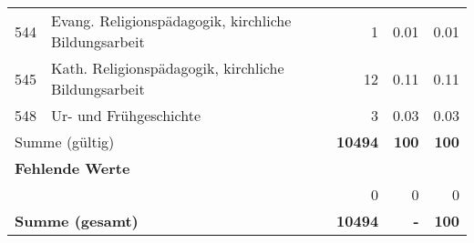 \begin{longtable}{lXrrr}
        544 & \multicolumn{1}{X}{Evang. Religionspädagogik, kirchliche Bildungsarbeit} & %
          \num{1} &
          \num[round-mode=places,round-precision=2]{0.01} &
          \num[round-mode=places,round-precision=2]{0.01} \\

        545 & \multicolumn{1}{X}{Kath. Religionspädagogik, kirchliche Bildungsarbeit} & %
          \num{12} &
          \num[round-mode=places,round-precision=2]{0.11} &
          \num[round-mode=places,round-precision=2]{0.11} \\

        548 & \multicolumn{1}{X}{Ur- und Frühgeschichte} & %
          \num{3} &
          \num[round-mode=places,round-precision=2]{0.03} &
          \num[round-mode=places,round-precision=2]{0.03} \\

     \midrule
     \multicolumn{2}{l}{Summe (gültig)} &
       \textbf{\num{10494}} &
     \textbf{\num{100}} &
       \textbf{\num[round-mode=places,round-precision=2]{100}} \\
     \multicolumn{5}{l}{\textbf{Fehlende Werte}}\\
      & & 0 & 0 & 0 \\
     \midrule
     \multicolumn{2}{l}{\textbf{Summe (gesamt)}} &
          \textbf{\num{10494}} &
        \textbf{-} &
        \textbf{\num{100}} \\
     \bottomrule
     \end{longtable}
     
